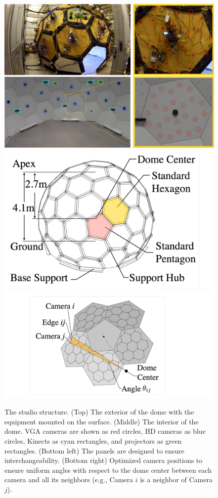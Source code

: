 	\begin{figure}
		\centering       
		\includegraphics[trim=0 0 0 0,clip,width=\linewidth]{figures/Dome_photo_0815}
		\includegraphics[trim=0 0 100 0,clip,width=0.48\linewidth]{figures/DomeFigure2} 
		\includegraphics[trim=230 50 400 50,clip,width=0.48\linewidth]{figures/DomeFigure3}
		\caption{The studio structure. (Top) The exterior of the dome with the equipment mounted on the surface. (Middle) The interior of the dome. VGA cameras are shown as red circles, HD cameras as blue circles, Kinects as cyan rectangles, and projectors as green rectangles. (Bottom left) The panels are designed to ensure interchangeability. (Bottom right) Optimized camera positions to ensure uniform angles with respect to the dome center between each camera and all its neighbors (e.g., Camera $i$ is a neighbor of Camera $j$).} 
		\label{fig:domeFigure}
	\end{figure}
	
